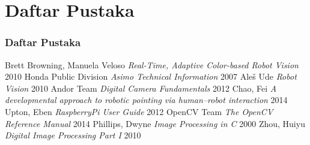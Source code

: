 \documentclass[table,dvipsnames]{beamer}
\begin{document}
%

\section{Daftar Pustaka}

\begin{frame}
\frametitle{Daftar Pustaka}
\footnotesize{
\begin{thebibliography}{99} %
 Brett Browning, Manuela Veloso \textit{Real-Time, Adaptive Color-based Robot Vision} 2010
 Honda Public Division \textit{Asimo Technical Information} 2007
 Aleš Ude \textit{Robot Vision} 2010
 Andor Team \textit{Digital Camera Fundamentals} 2012
 Chao, Fei \textit{A developmental approach to robotic pointing via human–robot interaction} 2014
 Upton, Eben \textit{RaspberryPi User Guide} 2012
 OpenCV Team \textit{The OpenCV Reference Manual} 2014
 Phillips, Dwyne \textit{Image Processing in C} 2000
 Zhou, Huiyu \textit{Digital Image Processing Part I} 2010
\end{thebibliography}
}
\end{frame}
\end{document}
